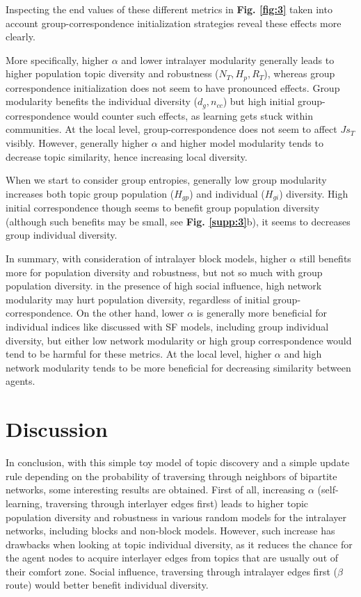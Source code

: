 \documentclass{svproc}
\begin{document}
Inspecting the end values of these different metrics in \textbf{Fig. \ref{fig:3}} taken into account group-correspondence initialization strategies reveal these effects more clearly.

More specifically, higher $\alpha$ and lower intralayer modularity generally leads to higher population topic diversity and robustness ($N_T, H_p, R_T$), whereas group correspondence initialization does not seem to have pronounced effects. Group modularity benefits the individual diversity ($d_g, n_{cc}$) but high initial group-correspondence would counter such effects, as learning gets stuck within communities. At the local level, group-correspondence does not seem to affect $Js_T$ visibly. However, generally higher $\alpha$ and higher model modularity tends to decrease topic similarity, hence increasing local diversity.

When we start to consider group entropies, generally low group modularity increases both topic group population ($H_{gp}$) and individual ($H_{gi}$) diversity. High initial correspondence though seems to benefit group population diversity (although such benefits may be small, see \textbf{Fig. \ref{supp:3}}b), it seems to decreases group individual diversity.

In summary, with consideration of intralayer block models, higher $\alpha$ still benefits more for population diversity and robustness, but not so much with group population diversity. in the presence of high social influence, high network modularity may hurt population diversity, regardless of initial group-correspondence. On the other hand, lower $\alpha$ is generally more beneficial for individual indices like discussed with SF models, including group individual diversity, but either low network modularity or high group correspondence would tend to be harmful for these metrics. At the local level, higher $\alpha$ and high network modularity tends to be more beneficial for decreasing similarity between agents.

\section{Discussion}

In conclusion, with this simple toy model of topic discovery and a simple update rule depending on the probability of traversing through neighbors of bipartite networks, some interesting results are obtained. First of all, increasing $\alpha$ (self-learning, traversing through interlayer edges first) leads to higher topic population diversity and robustness in various random models for the intralayer networks, including blocks and non-block models. However, such increase has drawbacks when looking at topic individual diversity, as it reduces the chance for the agent nodes to acquire interlayer edges from topics that are usually out of their comfort zone. Social influence, traversing through intralayer edges first ($\beta$ route) would better benefit individual diversity.
\end{document}
